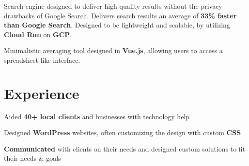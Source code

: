 \documentclass[letterpaper]{deedy-resume} %
\begin{document}
\begin{minipage}[t]{0.66\textwidth}
\sectionspace %

Search engine designed to deliver high quality results without the privacy drawbacks of Google Search. Delivers search results an average of \textbf{33\% faster than Google Search}. Designed to be lightweight and scalable, by utilizing \textbf{Cloud Run} on \textbf{GCP}.

\sectionspace %


Minimalistic averaging tool designed in \textbf{Vue.js}, allowing users to access a spreadsheet-like interface.

\sectionspace %


\section{Experience}


\vspace{\topsep} %
\begin{tightitemize}
\item Aided \textbf{40+ local clients} and businesses with technology help
\item Designed \textbf{WordPress} websites, often customizing the design with custom \textbf{CSS}
\item \textbf{Communicated} with clients on their needs and designed custom solutions to fit their needs \& goals
\end{tightitemize}

\sectionspace %




\end{minipage}
\end{document}
